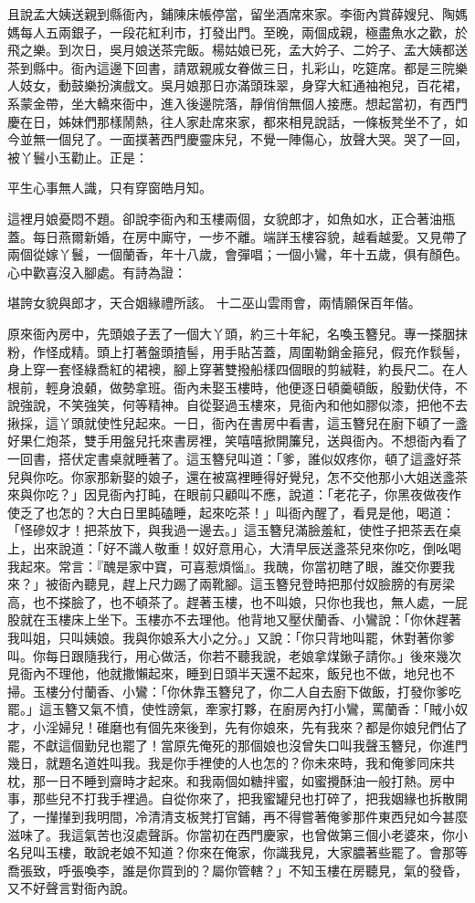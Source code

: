 且說孟大姨送親到縣衙內，鋪陳床帳停當，留坐酒席來家。李衙內賞薛嫂兒、陶媽媽每人五兩銀子，一段花紅利市，打發出門。至晚，兩個成親，極盡魚水之歡，於飛之樂。到次日，吳月娘送茶完飯。楊姑娘已死，孟大妗子、二妗子、孟大姨都送茶到縣中。衙內這邊下回書，請眾親戚女眷做三日，扎彩山，吃筵席。都是三院樂人妓女，動鼓樂扮演戲文。吳月娘那日亦滿頭珠翠，身穿大紅通袖袍兒，百花裙，系蒙金帶，坐大轎來衙中，進入後邊院落，靜俏俏無個人接應。想起當初，有西門慶在日，姊妹們那樣鬧熱，往人家赴席來家，都來相見說話，一條板凳坐不了，如今並無一個兒了。一面撲著西門慶靈床兒，不覺一陣傷心，放聲大哭。哭了一回，被丫鬟小玉勸止。正是：

平生心事無人識，只有穿窗皓月知。

這裡月娘憂悶不題。卻說李衙內和玉樓兩個，女貌郎才，如魚如水，正合著油瓶蓋。每日燕爾新婚，在房中廝守，一步不離。端詳玉樓容貌，越看越愛。又見帶了兩個從嫁丫鬟，一個蘭香，年十八歲，會彈唱；一個小鸞，年十五歲，俱有顏色。心中歡喜沒入腳處。有詩為證：

堪誇女貌與郎才，天合姻緣禮所該。
十二巫山雲雨會，兩情願保百年偕。

原來衙內房中，先頭娘子丟了一個大丫頭，約三十年紀，名喚玉簪兒。專一搽胭抹粉，作怪成精。頭上打著盤頭揸髻，用手貼苫蓋，周圍勒銷金箍兒，假充作䯼髻，身上穿一套怪綠喬紅的裙襖，腳上穿著雙撥船樣四個眼的剪絨鞋，約長尺二。在人根前，輕身浪顙，做勢拿班。衙內未娶玉樓時，他便逐日頓羹頓飯，殷勤伏侍，不說強說，不笑強笑，何等精神。自從娶過玉樓來，見衙內和他如膠似漆，把他不去揪採，這丫頭就使性兒起來。一日，衙內在書房中看書，這玉簪兒在廚下頓了一盞好果仁炮茶，雙手用盤兒托來書房裡，笑嘻嘻掀開簾兒，送與衙內。不想衙內看了一回書，搭伏定書桌就睡著了。這玉簪兒叫道：「爹，誰似奴疼你，頓了這盞好茶兒與你吃。你家那新娶的娘子，還在被窩裡睡得好覺兒，怎不交他那小大姐送盞茶來與你吃？」因見衙內打盹，在眼前只顧叫不應，說道：「老花子，你黑夜做夜作使乏了也怎的？大白日里盹磕睡，起來吃茶！」叫衙內醒了，看見是他，喝道：「怪磣奴才！把茶放下，與我過一邊去。」這玉簪兒滿臉羞紅，使性子把茶丟在桌上，出來說道：「好不識人敬重！奴好意用心，大清早辰送盞茶兒來你吃，倒吆喝我起來。常言：『醜是家中寶，可喜惹煩惱』。我醜，你當初瞎了眼，誰交你要我來？」被衙內聽見，趕上尺力踢了兩靴腳。這玉簪兒登時把那付奴臉膀的有房梁高，也不搽臉了，也不頓茶了。趕著玉樓，也不叫娘，只你也我也，無人處，一屁股就在玉樓床上坐下。玉樓亦不去理他。他背地又壓伏蘭香、小鸞說：「你休趕著我叫姐，只叫姨娘。我與你娘系大小之分。」又說：「你只背地叫罷，休對著你爹叫。你每日跟隨我行，用心做活，你若不聽我說，老娘拿煤鍬子請你。」後來幾次見衙內不理他，他就撒懶起來，睡到日頭半天還不起來，飯兒也不做，地兒也不掃。玉樓分付蘭香、小鸞：「你休靠玉簪兒了，你二人自去廚下做飯，打發你爹吃罷。」這玉簪又氣不憤，使性謗氣，牽家打夥，在廚房內打小鸞，罵蘭香：「賊小奴才，小淫婦兒！碓磨也有個先來後到，先有你娘來，先有我來？都是你娘兒們佔了罷，不獻這個勤兒也罷了！當原先俺死的那個娘也沒曾失口叫我聲玉簪兒，你進門幾日，就題名道姓叫我。我是你手裡使的人也怎的？你未來時，我和俺爹同床共枕，那一日不睡到齋時才起來。和我兩個如糖拌蜜，如蜜攪酥油一般打熱。房中事，那些兒不打我手裡過。自從你來了，把我蜜罐兒也打碎了，把我姻緣也拆散開了，一攆攆到我明間，冷清清支板凳打官鋪，再不得嘗著俺爹那件東西兒如今甚麼滋味了。我這氣苦也沒處聲訴。你當初在西門慶家，也曾做第三個小老婆來，你小名兒叫玉樓，敢說老娘不知道？你來在俺家，你識我見，大家膿著些罷了。會那等喬張致，呼張喚李，誰是你買到的？屬你管轄？」不知玉樓在房聽見，氣的發昏，又不好聲言對衙內說。

